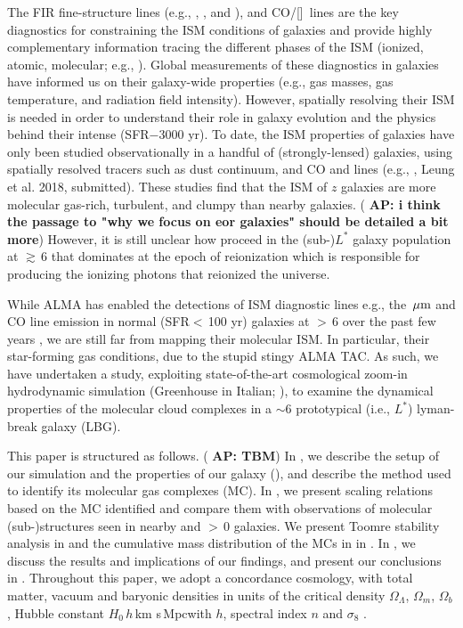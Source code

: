 \documentclass[apj]{emulateapj} %
\newcommand{\AP}[1]{({\bf \color{apcolor} AP: #1})}
\begin{document}
The FIR fine-structure lines (e.g., \cii, \nii, and \oiii), and CO/[\ci]~lines are the key diagnostics for
constraining the ISM conditions of galaxies and
provide highly complementary information tracing the different phases of the ISM (ionized,
atomic, molecular; e.g., \citealt{Scoville74a, Rubin85a, Malhotra01a}).
Global measurements of these diagnostics in \highz galaxies
have informed us on their galaxy-wide properties (e.g.,
gas masses, gas temperature, and radiation field intensity).
However, spatially resolving their ISM is needed in order to understand their role in galaxy evolution and
the physics behind their intense \SF (SFR$-$3000\,\Msun\,yr\pmOne).
To date, the ISM properties of \highz galaxies
have only been studied observationally in a handful of (strongly-lensed)
galaxies, using spatially resolved tracers such as
dust continuum, and CO and \cii lines (e.g., \citealt{Swinbank11a, Hodge15a, Ferkinhoff15a, Hodge16a},
Leung et al. 2018, submitted).
These studies find that the ISM of $z$ galaxies are more
molecular gas-rich, turbulent, and clumpy than nearby galaxies.
\AP{i think the passage to "why we focus on eor galaxies" should be detailed a bit more}
However, it is still unclear how \SF proceed in the (sub-)$L^*$ galaxy population at \z$\gtrsim$\,6
that dominates  \SF at the epoch of reionization which is responsible for producing the
ionizing photons that reionized the universe.

While ALMA has enabled the detections of
ISM diagnostic lines e.g., the \,$\mbox{$\mu$m}$ and CO line emission in
normal (SFR$<$\,100\,\Msun\,yr\pmOne) galaxies at \z$>$\,6 over the past few years \citep[e.g.,][]{Smit18a},
we are still far from mapping their molecular ISM.
In particular, their star-forming gas conditions, due to the stupid stingy ALMA TAC.
As such, we have undertaken a study, exploiting
state-of-the-art cosmological zoom-in hydrodynamic simulation
 (Greenhouse in Italian; \citealt{Pallottini17a, Pallottini17b}), to examine
the dynamical properties of the molecular cloud complexes in a \z$\sim$6 prototypical (i.e., $L^*$) lyman-break
galaxy (LBG).

This paper is structured as follows.
\AP{TBM}
In , we describe the setup of our simulation and the properties of our galaxy (\flower),
and describe the method used to identify its molecular gas complexes (MC).
In , we present scaling relations based on
the MC identified and compare them with observations of molecular
(sub-)structures seen in nearby and \z$>$\,0 galaxies.
We present Toomre stability analysis in  and
the cumulative mass distribution of the MCs in \flower in .
In , we discuss the results and implications of our findings,
and present our conclusions in .
Throughout this paper, we adopt a concordance cosmology, with total matter, vacuum and baryonic densities
in units of the critical density $\Omega_{\Lambda}$, $\Omega_m$, $\Omega_b$,
Hubble constant $H_0$\,$h$\,km s\pmOne\,Mpc\pmOne with $h$,
spectral index $n$ and $\sigma_8$ \citep{Planck14a}.
\end{document}
